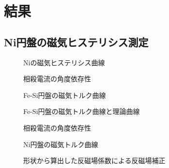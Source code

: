 \section{結果}
\subsection{Ni円盤の磁気ヒステリシス測定}
\begin{figure}[hptb]
  \begin{center}
    
    \caption{Niの磁気ヒステリシス曲線}
  \end{center}
\end{figure}

\begin{figure}[hptb]
  \begin{center}
    
    \caption{相殺電流の角度依存性}
  \end{center}
\end{figure}

\begin{figure}[hptb]
  \begin{center}
    
    \caption{Fe-Si円盤の磁気トルク曲線}
  \end{center}
\end{figure}

\begin{figure}[hptb]
  \begin{center}
    
    \caption{Fe-Si円盤の磁気トルク曲線と理論曲線}
  \end{center}
\end{figure}

\begin{figure}[hptb]
  \begin{center}
    
    \caption{相殺電流の角度依存性}
  \end{center}
\end{figure}

\begin{figure}[hptb]
  \begin{center}
    
    \caption{Ni円盤の磁気トルク曲線}
  \end{center}
\end{figure}

\begin{figure}[hptb]
  \begin{center}
    
    \caption{形状から算出した反磁場係数による反磁場補正}
  \end{center}
\end{figure}


